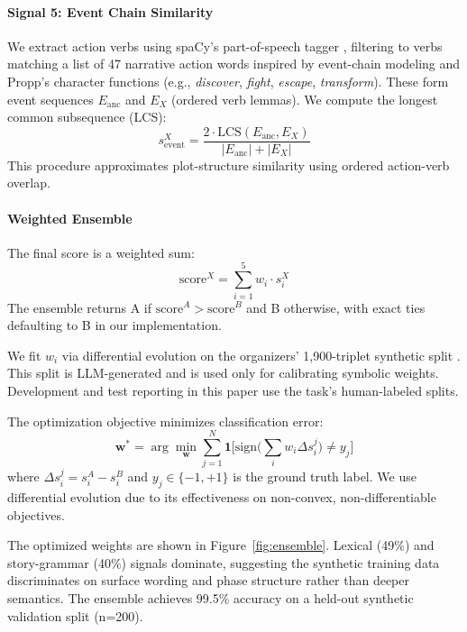 \documentclass[11pt]{article}
\begin{document}
\paragraph{Signal 5: Event Chain Similarity}
We extract action verbs using spaCy's part-of-speech tagger \citep{spacy-2025}, filtering to verbs matching a list of 47 narrative action words inspired by event-chain modeling and Propp's character functions \citep{chambers2008narrativechains,propp1968morphology} (e.g., \emph{discover}, \emph{fight}, \emph{escape}, \emph{transform}). These form event sequences $E_{\text{anc}}$ and $E_X$ (ordered verb lemmas). We compute the longest common subsequence (LCS):
\begin{equation}
s_{\text{event}}^X = \frac{2 \cdot \text{LCS}(E_{\text{anc}}, E_X)}{|E_{\text{anc}}| + |E_X|}
\end{equation}
This procedure approximates plot-structure similarity using ordered action-verb overlap.


\paragraph{Weighted Ensemble}
The final score is a weighted sum:
\begin{equation}
\text{score}^X = \sum_{i=1}^{5} w_i \cdot s_i^X
\end{equation}
The ensemble returns A if $\text{score}^A > \text{score}^B$ and B otherwise, with exact ties defaulting to B in our implementation.

We fit $w_i$ via differential evolution \citep{storn1997differential} on the organizers' 1,900-triplet synthetic split \citep{narrative-similarity-data-2026}. This split is LLM-generated and is used only for calibrating symbolic weights. Development and test reporting in this paper use the task's human-labeled splits.

The optimization objective minimizes classification error:
\begin{equation}
\mathbf{w}^* = \arg\min_{\mathbf{w}} \sum_{j=1}^{N} \mathbf{1}\Big[\text{sign}\big(\textstyle\sum_{i} w_i \Delta s_i^j\big) \neq y_j\Big]
\end{equation}
where $\Delta s_i^j = s_i^A - s_i^B$ and $y_j \in \{-1, +1\}$ is the ground truth label. We use differential evolution due to its effectiveness on non-convex, non-differentiable objectives. 

The optimized weights are shown in Figure~\ref{fig:ensemble}. Lexical (49\%) and story-grammar (40\%) signals dominate, suggesting the synthetic training data discriminates on surface wording and phase structure rather than deeper semantics. The ensemble achieves 99.5\% accuracy on a held-out synthetic validation split (n=200).
\end{document}
